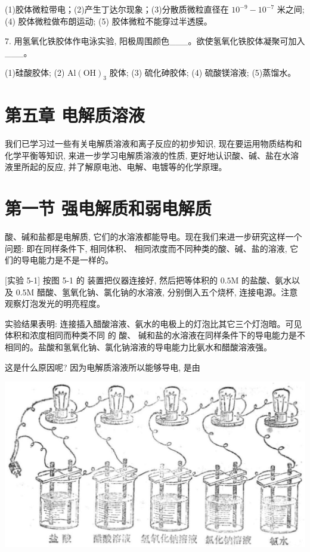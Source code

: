 \documentclass[10pt]{article}
\begin{document}
(1)胶体微粒带电；(2)产生丁达尔现象；(3)分散质微粒直径在 \({10}^{-9} - {10}^{-7}\) 米之间; (4) 胶体微粒做布朗运动; (5) 胶体微粒不能穿过半透膜。

7. 用氢氧化铁胶体作电泳实验, 阳极周围颜色\_\_\_。欲使氢氧化铁胶体凝聚可加入\_\_\_。

(1)硅酸胶体; (2) \(\mathrm{{Al}}{\left( \mathrm{{OH}}\right) }_{3}\) 胶体; (3) 硫化砷胶体; (4) 硫酸镁溶液; (5)蒸馏水。

\section*{第五章 电解质溶液}

我们已学习过一些有关电解质溶液和离子反应的初步知识, 现在要运用物质结构和化学平衡等知识, 来进一步学习电解质溶液的性质, 更好地认识酸、碱、盐在水溶液里所起的反应, 并了解原电池、电解、电镀等的化学原理。

\section*{第一节 强电解质和弱电解质}

酸、碱和盐都是电解质, 它们的水溶液都能导电。现在我们来进一步研究这样一个问题: 即在同样条件下, 相同体积、 相同浓度而不同种类的酸、碱、盐的溶液, 它们的导电能力是不是一样的。

[实验 5-1] 按图 5-1 的 装置把仪器连接好, 然后把等体积的 \({0.5}\mathrm{M}\) 的盐酸、氨水以及 \({0.5}\mathrm{M}\) 醋酸、氢氧化钠、氯化钠的水溶液, 分别倒入五个烧杯, 连接电源。注意观察灯泡发光的明亮程度。

实验结果表明: 连接插入醋酸溶液、氨水的电极上的灯泡比其它三个灯泡暗。可见体积和浓度相同而种类不同 的 酸、 碱和盐的水溶液在同样条件下的导电能力是不相同的。盐酸和氢氧化钠、氯化钠溶液的导电能力比氨水和醋酸溶液强。

这是什么原因呢? 因为电解质溶液所以能够导电, 是由

\begin{center}
\includegraphics[max width=1.0\textwidth]{images/01912d13-9986-7822-a012-3f3f7be99dcb_128_489990.jpg}
\end{center}
\end{document}
